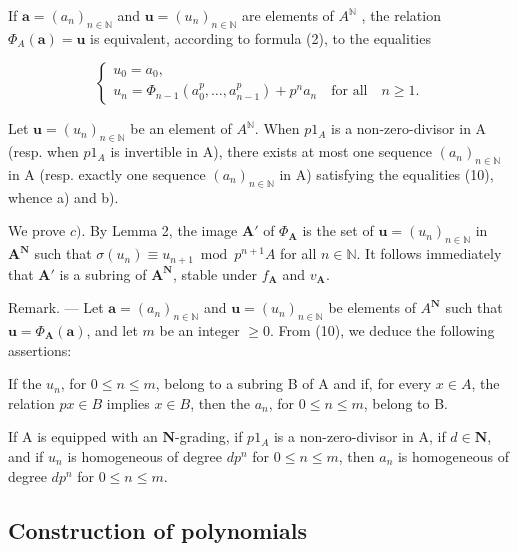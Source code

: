 If \(\boldsymbol{a} = (a_n)_{n \in \mathbb{N}}\) and \(\boldsymbol{u} = (u_n)_{n \in \mathbb{N}}\) are elements of \(A^{\mathbb{N}}\) , the relation \(\Phi_A(\boldsymbol{a}) = \boldsymbol{u}\) is equivalent, according to formula (2), to the equalities

\[
\left\{ \begin{array}{l} u _ {0} = a _ {0}, \\ u _ {n} = \Phi_ {n - 1} \left(a _ {0} ^ {p}, \dots , a _ {n - 1} ^ {p}\right) + p ^ {n} a _ {n} \quad \text {for all} \quad n \geqslant 1. \end{array} \right.\tag{10}
\]

Let \(\boldsymbol{u} = (u_{n})_{n \in \mathbb{N}}\) be an element of \(A^{\mathbb{N}}\). When \(p1_{A}\) is a non-zero-divisor in A (resp. when \(p1_{A}\) is invertible in A), there exists at most one sequence \((a_{n})_{n \in \mathbb{N}}\) in A (resp. exactly one sequence \((a_{n})_{n \in \mathbb{N}}\) in A) satisfying the equalities (10), whence a) and b).

We prove \(c)\). By Lemma 2, the image \(\mathbf{A}'\) of \(\Phi_{\mathbf{A}}\) is the set of \(\boldsymbol{u} = (u_n)_{n \in \mathbb{N}}\) in \(\mathbf{A}^{\mathbf{N}}\) such that \(\sigma(u_n) \equiv u_{n+1} \bmod p^{n+1}A\) for all \(n \in \mathbb{N}\). It follows immediately that \(\mathbf{A}'\) is a subring of \(\mathbf{A}^{\mathbf{N}}\), stable under \(f_{\mathbf{A}}\) and \(v_{\mathbf{A}}\).

Remark. — Let \(\boldsymbol{a} = (a_n)_{n \in \mathbb{N}}\) and \(\boldsymbol{u} = (u_n)_{n \in \mathbb{N}}\) be elements of \(A^{\mathbf{N}}\) such that \(\boldsymbol{u} = \Phi_{\mathbf{A}}(\boldsymbol{a})\), and let \(m\) be an integer \(\geqslant 0\). From (10), we deduce the following assertions:

If the \(u_n\), for \(0 \leqslant n \leqslant m\), belong to a subring B of A and if, for every \(x \in A\), the relation \(px \in B\) implies \(x \in B\), then the \(a_n\), for \(0 \leqslant n \leqslant m\), belong to B.

If A is equipped with an \(\mathbf{N}\)-grading, if \(p1_{A}\) is a non-zero-divisor in A, if \(d \in \mathbf{N}\), and if \(u_{n}\) is homogeneous of degree \(dp^{n}\) for \(0 \leqslant n \leqslant m\), then \(a_{n}\) is homogeneous of degree \(dp^{n}\) for \(0 \leqslant n \leqslant m\).

\subsection{Construction of polynomials}

